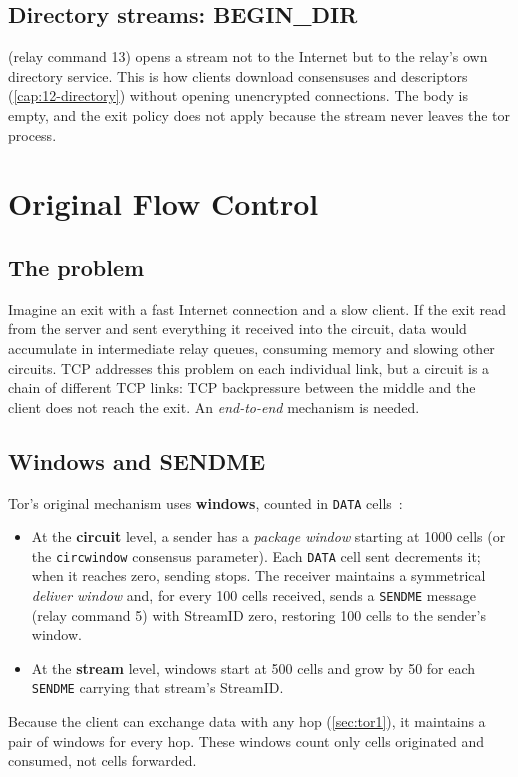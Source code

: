 \subsection{Directory streams: BEGIN\_DIR}

 (relay command 13) opens a stream not to the Internet but to the relay's own directory service. This is how clients download consensuses and descriptors (\cref{cap:12-directory}) without opening unencrypted connections. The body is empty, and the exit policy does not apply because the stream never leaves the tor process.

\section{Original Flow Control}\label{sec:flusso-classico}

\subsection{The problem}

Imagine an exit with a fast Internet connection and a slow client. If the exit read from the server and sent everything it received into the circuit, data would accumulate in intermediate relay queues, consuming memory and slowing other circuits. TCP addresses this problem on each individual link, but a circuit is a chain of different TCP links: TCP backpressure between the middle and the client does not reach the exit. An \emph{end-to-end} mechanism is needed.

\subsection{Windows and SENDME}

Tor's original mechanism uses \textbf{windows}, counted in \texttt{DATA} cells~:
\begin{itemize}
  \item At the \textbf{circuit} level, a sender has a \emph{package window} starting at 1000 cells (or the \texttt{circwindow} consensus parameter). Each \texttt{DATA} cell sent decrements it; when it reaches zero, sending stops. The receiver maintains a symmetrical \emph{deliver window} and, for every 100 cells received, sends a \texttt{SENDME} message (relay command 5) with StreamID zero, restoring 100 cells to the sender's window.
  \item At the \textbf{stream} level, windows start at 500 cells and grow by 50 for each \texttt{SENDME} carrying that stream's StreamID.
\end{itemize}
Because the client can exchange data with any hop (\cref{sec:tor1}), it maintains a pair of windows for every hop. These windows count only cells originated and consumed, not cells forwarded.

